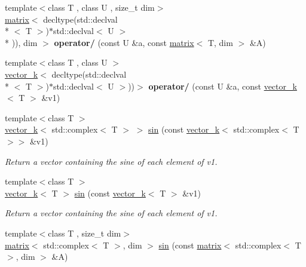 \begin{DoxyCompactItemize}
\item 
\hypertarget{namespacekeycpp_a88f5fa68e3f7fb39690f9e5c93bafc5c}{{\footnotesize template$<$class T , class U , size\-\_\-t dim$>$ }\\\hyperlink{classkeycpp_1_1matrix}{matrix}$<$ decltype(std\-::declval\\*
$<$ T $>$)$\ast$std\-::declval$<$ U $>$\\*
)), dim $>$ {\bfseries operator/} (const U \&a, const \hyperlink{classkeycpp_1_1matrix}{matrix}$<$ T, dim $>$ \&A)}\label{namespacekeycpp_a88f5fa68e3f7fb39690f9e5c93bafc5c}

\item 
\hypertarget{namespacekeycpp_aa5daf45d6627feee18402005fcd83cfd}{{\footnotesize template$<$class T , class U $>$ }\\\hyperlink{classkeycpp_1_1vector__k}{vector\-\_\-k}$<$ decltype(std\-::declval\\*
$<$ T $>$)$\ast$std\-::declval$<$ U $>$))$>$ {\bfseries operator/} (const U \&a, const \hyperlink{classkeycpp_1_1vector__k}{vector\-\_\-k}$<$ T $>$ \&v1)}\label{namespacekeycpp_aa5daf45d6627feee18402005fcd83cfd}

\item 
\hypertarget{namespacekeycpp_a3fad354ed572051e939cc71209c112ab}{{\footnotesize template$<$class T $>$ }\\\hyperlink{classkeycpp_1_1vector__k}{vector\-\_\-k}$<$ std\-::complex$<$ T $>$ $>$ \hyperlink{namespacekeycpp_a3fad354ed572051e939cc71209c112ab}{sin} (const \hyperlink{classkeycpp_1_1vector__k}{vector\-\_\-k}$<$ std\-::complex$<$ T $>$$>$ \&v1)}\label{namespacekeycpp_a3fad354ed572051e939cc71209c112ab}

\begin{DoxyCompactList}\small\item\em Return a vector containing the sine of each element of v1. \end{DoxyCompactList}\item 
\hypertarget{namespacekeycpp_aea600162295a122a2371d75f80f764c5}{{\footnotesize template$<$class T $>$ }\\\hyperlink{classkeycpp_1_1vector__k}{vector\-\_\-k}$<$ T $>$ \hyperlink{namespacekeycpp_aea600162295a122a2371d75f80f764c5}{sin} (const \hyperlink{classkeycpp_1_1vector__k}{vector\-\_\-k}$<$ T $>$ \&v1)}\label{namespacekeycpp_aea600162295a122a2371d75f80f764c5}

\begin{DoxyCompactList}\small\item\em Return a vector containing the sine of each element of v1. \end{DoxyCompactList}\item 
\hypertarget{namespacekeycpp_a18a3ebbda3c25527ae280f5c5725ff4e}{{\footnotesize template$<$class T , size\-\_\-t dim$>$ }\\\hyperlink{classkeycpp_1_1matrix}{matrix}$<$ std\-::complex$<$ T $>$, dim $>$ \hyperlink{namespacekeycpp_a18a3ebbda3c25527ae280f5c5725ff4e}{sin} (const \hyperlink{classkeycpp_1_1matrix}{matrix}$<$ std\-::complex$<$ T $>$, dim $>$ \&A)}\label{namespacekeycpp_a18a3ebbda3c25527ae280f5c5725ff4e}


\end{DoxyCompactItemize}
